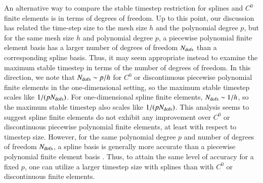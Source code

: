 \documentclass[preprint,10pt]{elsarticle}
\begin{document}
{An alternative way to compare the stable timestep restriction for splines and $C^0$ finite elements is in terms of degrees of freedom.  Up to this point, our discussion has related the time-step size to the mesh size $h$ and the polynomial degree $p$, but for the same mesh size $h$ and polynomial degree $p$, a piecewise polynomial finite element basis has a larger number of degrees of freedom $N_{\rm dofs}$ than a corresponding spline basis.  Thus, it may seem appropriate instead to examine the maximum stable timestep in terms of the number of degrees of freedom.  In this direction, we note that $N_{\rm dofs} \sim p/h$ for $C^0$ or discontinuous piecewise polynomial finite elements in the one-dimensional setting, so the maximum stable timestep scales like $1/(pN_{\rm dofs})$.  For one-dimensional spline finite elements, $N_{\rm dofs} \sim 1/h$, so the maximum stable timestep also scales like $1/(pN_{\rm dofs})$.  This analysis seems to suggest spline finite elements do not exhibit any improvement over $C^0$ or discontinuous piecewise polynomial finite elements, at least with respect to timestep size.  However, for the same polynomial degree $p$ and number of degrees of freedom $N_{\rm dofs}$, a spline basis is generally more accurate than a piecewise polynomial finite element basis \cite{evans2009n}.  Thus, to attain the same level of accuracy for a fixed $p$, one can utilize a larger timestep size with splines than with $C^0$ or discontinuous finite elements.  %
}
\end{document}
